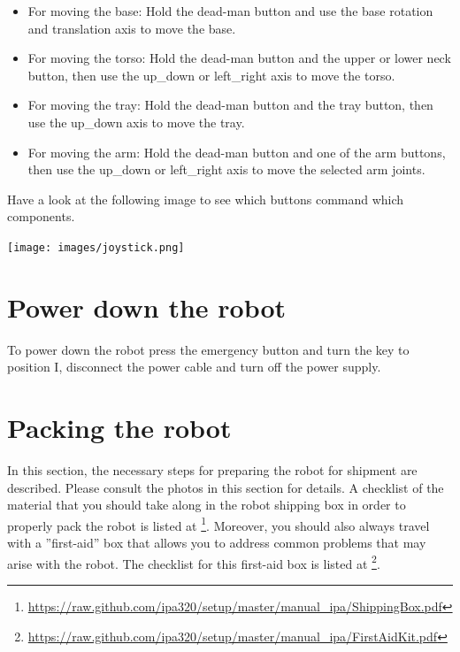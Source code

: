 \begin{itemize}
\item For moving the base: Hold the dead-man button and use the base rotation and translation axis to move the base.
\item For moving the torso: Hold the dead-man button and the upper or lower neck button, then use the up\_down or left\_right axis to move the torso.
\item For moving the tray: Hold the dead-man button and the tray button, then use the up\_down axis to move the tray.
\item For moving the arm: Hold the dead-man button and one of the arm buttons, then use the up\_down or left\_right axis to move the selected arm joints.
\end{itemize}

Have a look at the following image to see which buttons command which components. 
\begin{center}
\texttt{[image: images/joystick.png]}
\end{center}

\section{Power down the robot}
To power down the robot press the emergency button and turn the key to position I, disconnect the power cable and turn off the power supply.

\section{Packing the robot}
In this section, the necessary steps for preparing the robot for shipment are described. Please consult the photos in this section for details.
A checklist of the material that you should take along in the robot shipping box in order to properly pack the robot is listed at \footnote{\url{https://raw.github.com/ipa320/setup/master/manual_ipa/ShippingBox.pdf}}.
Moreover, you should also always travel with a ''first-aid'' box that allows you to address common problems that may arise with the robot. The checklist for this first-aid box is listed at \footnote{\url{https://raw.github.com/ipa320/setup/master/manual_ipa/FirstAidKit.pdf}}.

